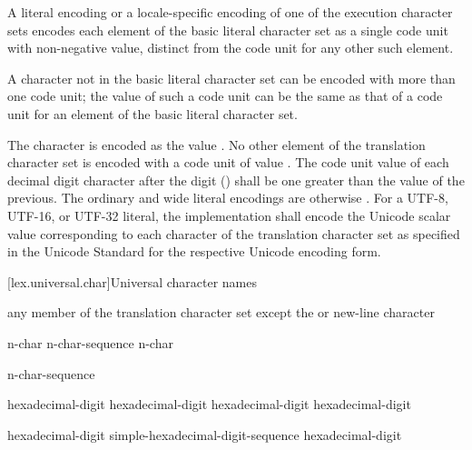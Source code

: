 \pnum
A literal encoding or a locale-specific encoding of one of
the execution character sets
encodes each element of the basic literal character set as
a single code unit with non-negative value,
distinct from the code unit for any other such element.
\begin{note}
A character not in the basic literal character set
can be encoded with more than one code unit;
the value of such a code unit can be the same as
that of a code unit for an element of the basic literal character set.
\end{note}
%
%
The  character is encoded as the value .
No other element of the translation character set
is encoded with a code unit of value .
The code unit value of each decimal digit character after the digit  ()
shall be one greater than the value of the previous.
The ordinary and wide literal encodings are otherwise
.
%
%
%
For a UTF-8, UTF-16, or UTF-32 literal,
the implementation shall encode
the Unicode scalar value
corresponding to each character of the translation character set
as specified in the Unicode Standard
for the respective Unicode encoding form.

[lex.universal.char]{Universal character names}

\begin{bnf}
\br
     \textnormal{any member of the translation character set except the  or new-line character}
\end{bnf}

\begin{bnf}
\br
    n-char\br
    n-char-sequence n-char
\end{bnf}

\begin{bnf}
\br
     n-char-sequence \terminal{\}}
\end{bnf}

\begin{bnf}
\br
    hexadecimal-digit hexadecimal-digit hexadecimal-digit hexadecimal-digit
\end{bnf}

\begin{bnf}
\br
    hexadecimal-digit\br
    simple-hexadecimal-digit-sequence hexadecimal-digit
\end{bnf}

